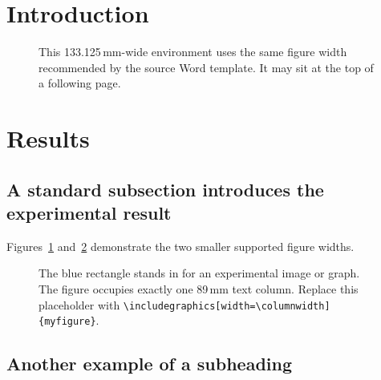 \documentclass{biorxiv-chrelli}
\begin{document}
\maketitle

\section{Introduction}
\lipsum[1-3]
\lipsum[4][1-6]

\begin{figure}[t]
  \centering
  \begin{minipage}{133.125mm}
    \centering
    \colorbox{biorxivblue}{\parbox[c][26mm][c]{\dimexpr\linewidth-2\fboxsep\relax}{\strut}}
    \caption{
      This 133.125\,mm-wide environment uses the same figure width recommended
      by the source Word template. It may sit at the top of a following page.}
    \label{fig:onehalf}
  \end{minipage}
\end{figure}


\section{Results}
\subsection{A standard subsection introduces the experimental result}
Figures~\ref{fig:onehalf} and~\ref{fig:one} demonstrate the two smaller
supported figure widths.
\lipsum[5]
\lipsum[6][1-6]

\begin{figure}[t]
  \centering
  \colorbox{biorxivblue}{\parbox[c][43mm][c]{\dimexpr\columnwidth-2\fboxsep\relax}{\strut}}
  \caption{
  The blue rectangle stands in for an experimental image or graph.
  The figure occupies exactly one 89\,mm text column. Replace this
  placeholder with \texttt{\textbackslash includegraphics[width=\textbackslash columnwidth]\{myfigure\}}.}
  \label{fig:one}
\end{figure}

\subsection{Another example of a subheading}
\lipsum[7-8]
\end{document}
